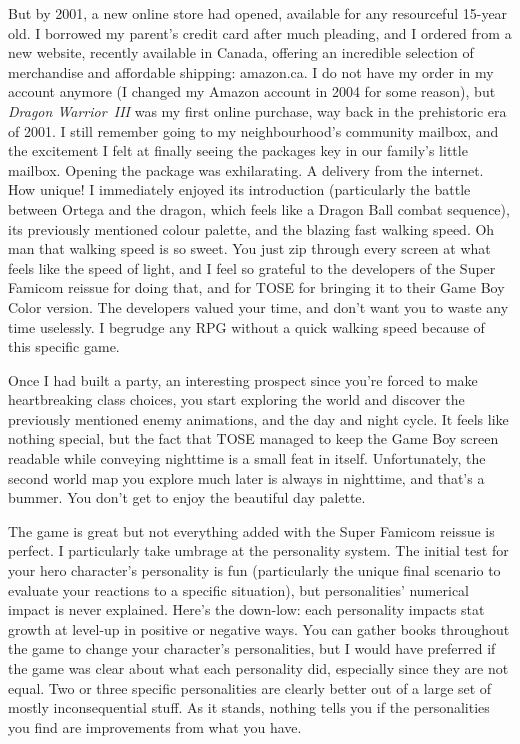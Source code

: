\documentclass{book}
\begin{document}
But by 2001, a new online store had opened, available for any resourceful 15-year old. I borrowed my parent’s credit card after much pleading, and I ordered from a new website, recently available in Canada, offering an incredible selection of merchandise and affordable shipping: amazon.ca. I do not have my order in my account anymore (I changed my Amazon account in 2004 for some reason), but \emph{Dragon Warrior~III} was my first online purchase, way back in the prehistoric era of 2001. I still remember going to my neighbourhood’s community mailbox, and the excitement I felt at finally seeing the packages key in our family’s little mailbox. Opening the package was exhilarating. A delivery from the internet. How unique! I immediately enjoyed its introduction (particularly the battle between Ortega and the dragon, which feels like a Dragon Ball combat sequence), its previously mentioned colour palette, and the blazing fast walking speed. Oh man that walking speed is so sweet. You just zip through every screen at what feels like the speed of light, and I feel so grateful to the developers of the Super Famicom reissue for doing that, and for TOSE for bringing it to their Game Boy Color version. The developers valued your time, and don’t want you to waste any time uselessly. I begrudge any RPG without a quick walking speed because of this specific game.\par
Once I had built a party, an interesting prospect since you’re forced to make heartbreaking class choices, you start exploring the world and discover the previously mentioned enemy animations, and the day and night cycle. It feels like nothing special, but the fact that TOSE managed to keep the Game Boy screen readable while conveying nighttime is a small feat in itself. Unfortunately, the second world map you explore much later is always in nighttime, and that’s a bummer. You don’t get to enjoy the beautiful day palette.\par
The game is great but not everything added with the Super Famicom reissue is perfect. I particularly take umbrage at the personality system. The initial test for your hero character’s personality is fun (particularly the unique final scenario to evaluate your reactions to a specific situation), but personalities’ numerical impact is never explained. Here’s the down-low: each personality impacts stat growth at level-up in positive or negative ways. You can gather books throughout the game to change your character’s personalities, but I would have preferred if the game was clear about what each personality did, especially since they are not equal. Two or three specific personalities are clearly better out of a large set of mostly inconsequential stuff. As it stands, nothing tells you if the personalities you find are improvements from what you have.\par
\end{document}
